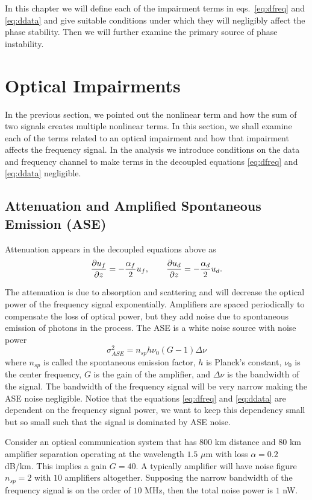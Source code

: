 In this chapter we will define each of the impairment terms in eqs.~\ref{eq:dfreq} and \ref{eq:ddata} and give suitable conditions under which they will negligibly affect the phase stability. Then we will further examine the primary source of phase instability.


\section{Optical Impairments} \label{sec:impair}

In the previous section, we pointed out the nonlinear term and how the sum of two signals creates multiple nonlinear terms. In this section, we shall examine each of the terms related to an optical impairment and how that impairment affects the frequency signal. In the analysis we introduce conditions on the data and frequency channel to make terms in the decoupled equations \ref{eq:dfreq} and \ref{eq:ddata} negligible. 

\subsection{Attenuation and Amplified Spontaneous Emission (ASE)}
%
Attenuation appears in the decoupled equations above as
%
\begin{equation*}
\frac{\partial u_f}{\partial z} = -\frac{\alpha_f}{2}u_f, \qquad \frac{\partial u_d}{\partial z} = -\frac{\alpha_d}{2}u_d.
\end{equation*}

The attenuation is due to absorption and scattering and will decrease the optical power of the frequency signal exponentially. Amplifiers are spaced periodically to compensate the loss of optical power, but they add noise due to spontaneous emission of photons in the process.  The ASE is a white noise source with noise power
%
\begin{equation}
\sigma^2_{ASE} = n_{sp}h\nu_0 (G-1)\Delta\nu
\end{equation}
%
where $n_{sp}$ is called the spontaneous emission factor, $h$ is Planck's constant, $\nu_0$ is the center frequency, $G$ is the gain of the amplifier, and $\Delta\nu$ is the bandwidth of the signal. The bandwidth of the frequency signal will be very narrow making the ASE noise negligible. Notice that the equations \ref{eq:dfreq} and \ref{eq:ddata} are dependent on the frequency signal power, we want to keep this dependency small but so small such that the signal is dominated by ASE noise.

Consider an optical communication system that has $800$ km distance and $80$ km amplifier separation operating at the wavelength $1.5$ $\mu$m with loss $\alpha = 0.2$ dB/km. This implies a gain $G=40$. A typically amplifier will have noise figure $n_{sp} = 2$ with $10$ amplifiers altogether. Supposing the narrow bandwidth of the frequency signal is on the order of $10$ MHz, then the total noise power is $1$ nW.

